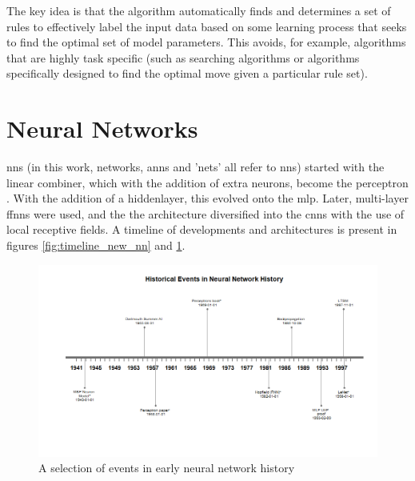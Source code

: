 The key idea is that the algorithm automatically finds and determines a set of rules to effectively label the input data based on some learning process that seeks to find the optimal set of model parameters. This avoids, for example, algorithms that are highly task specific (such as searching algorithms or algorithms specifically designed to find the optimal move given a particular rule set). \bigskip

\section{Neural Networks} 


\gls{nn}s (in this work, networks, \gls{ann}s and 'nets' all refer to \gls{nn}s) started with the linear combiner, which with the addition of extra neurons, become the perceptron \cite{haykin}. With the addition of a \gls{hiddenlayer}, this evolved onto the \gls{mlp}. Later, multi-layer \gls{ffnn}s were used, and the the architecture diversified into the \gls{cnn}s with the use of local receptive fields. A timeline of developments and architectures is present in figures \ref{fig:timeline_new_nn} and \ref{fig:timeline_old_nn}. \bigskip

\begin{figure}
    \centering
    \includegraphics[width=140mm,scale=1.5]{figs/timeline_old_nn.png}
    \caption{A selection of events in early neural network history}
    \label{fig:timeline_old_nn}
\end{figure}

